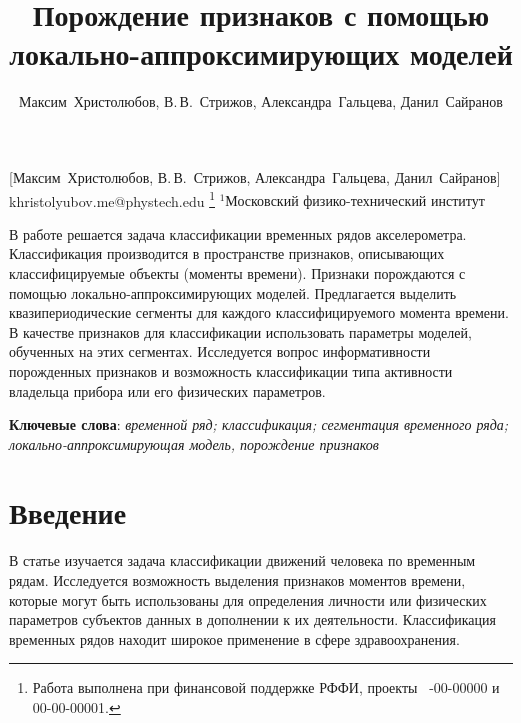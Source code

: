\documentclass[12pt, twoside]{article}
\begin{document}
\title
    [Порождение признаков с помощью локально-аппроксимирующих моделей] %
    {Порождение признаков с помощью локально-аппроксимирующих моделей}
\author
    [Максим~Христолюбов, В.\,В.~Стрижов] %
    {Максим~Христолюбов, В.\,В.~Стрижов, Александра~Гальцева, Данил~Сайранов} %
    [Максим~Христолюбов, В.\,В.~Стрижов, Александра~Гальцева, Данил~Сайранов] %
\email
    {khristolyubov.me@phystech.edu}
\thanks
    {Работа выполнена при
     финансовой поддержке РФФИ, проекты \No\ -00-00000 и 00-00-00001.}
\organization
    {$^1$Московский физико-технический институт}
\abstract
    {В работе решается задача классификации временных рядов акселерометра. Классификация производится в пространстве признаков, описывающих классифицируемые объекты (моменты времени). Признаки порождаются с помощью локально-аппроксимирующих моделей.  Предлагается выделить квазипериодические сегменты для каждого классифицируемого момента времени. В качестве признаков для классификации использовать параметры моделей, обученных на этих сегментах. Исследуется вопрос информативности порожденных признаков и возможность классификации типа активности владельца прибора или его физических параметров.
	
\bigskip
\noindent
\textbf{Ключевые слова}: \emph {временной ряд; классификация; сегментация временного ряда; локально-аппроксимирующая модель, порождение признаков}
}

\maketitle
\linenumbers

\section{Введение}

В статье изучается задача классификации движений человека по временным рядам. Исследуется возможность выделения признаков моментов времени, которые могут быть использованы для определения личности или физических параметров субъектов данных в дополнении к их деятельности. Классификация временных рядов находит широкое применение в сфере здравоохранения.
\end{document}
